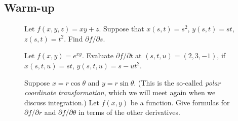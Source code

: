 \documentclass[12pt]{exam}
\theoremstyle{definition}
\begin{document}
\subsection{Warm-up}

\begin{questions}

\begin{figure}[ht]
\begin{minipage}[t]{0.7\linewidth}
\question Let $f(x, y, z) = xy + z$. Suppose that $x(s,t) = s^2$, $y(s,t) = st$, $z(s,t) = t^2$. Find $\partial f/\partial s$. 
\end{minipage} \hspace*{1cm}
\begin{minipage}[t]{0.25\linewidth}
\hfill
\end{minipage}
\end{figure}


\begin{figure}[ht]
\begin{minipage}[t]{0.7\linewidth}
\question Let $f(x,y) = e^{xy}$. Evaluate $\partial f / \partial t$ at $(s,t,u) = (2, 3, -1)$, if $x(s, t, u) = st$, $y(s, t, u) = s - ut^2$.
\end{minipage} \hspace*{1cm}
\begin{minipage}[t]{0.25\linewidth}
\hfill
\end{minipage}
\end{figure}


\newpage


\begin{figure}[ht]
\begin{minipage}[t]{0.7\linewidth}
\question \label{polar} Suppose $x = r \cos{\theta}$ and $y = r \sin{\theta}$. (This is the so-called \emph{polar coordinate transformation}, which we will meet again when we discuss integration.) Let $f(x,y)$ be a function. Give formulas for $\partial f / \partial r$ and $\partial f / \partial \theta$ in terms of the other derivatives.
\end{minipage} \hspace*{1cm}
\begin{minipage}[t]{0.25\linewidth}
\hfill
\end{minipage}
\end{figure}


\end{questions}
\end{document}
